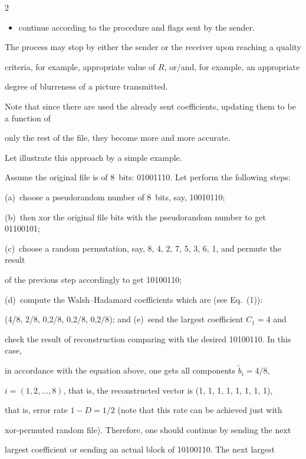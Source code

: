 \begin{multicols}{2}
\begin{itemize}
and

\item[(c)] continue according to the procedure and flags sent by the sender.

\end{itemize}



The process may stop by either the sender or the receiver upon reaching a quality 

criteria, for example, appropriate value of  $R$, or/and, for example, an appropriate 

degree of blurreness of a picture transmitted.

Note that since there are  used the already sent coefficients, updating them to be a  function of 

only the rest of the file, they become more and more accurate.



Let illustrate this approach by a simple example.

Assume the original file is of 8~bits: 01001110.  Let perform the following steps: 

(a)~choose a pseudorandom number of 8~bits, say, 10010110; 

(b)~then xor the original file bits with the pseudorandom number to get 01100101; 

(c)~choose a random permutation, say, 8, 4, 2, 7, 5, 3, 6, 1, and permute the result 

of the previous step accordingly to get 10100110; 

(d)~compute the Walsh--Hadamard coefficients which are (see Eq.~(1)):

(4/8, 2/8, 0,2/8, 0,2/8, 0,2/8);  and (e)~send the largest coefficient $C_1=4$ and 

check the result of reconstruction comparing with the desired 10100110.  In this case, 

in accordance with the equation above, one gets all components $\tilde b_i =4/8$, 

$i= (1,2,\ldots,8)$,  that is, the reconstructed vector is (1, 1, 1, 1, 1, 1, 1, 1), 

that is, error rate $1-D=1/2$ (note that this rate can be achieved just with 

xor-permuted  random file). Therefore, one should continue by sending the next 

largest coefficient or sending an actual block of 10100110.  The next largest 


\end{multicols}
